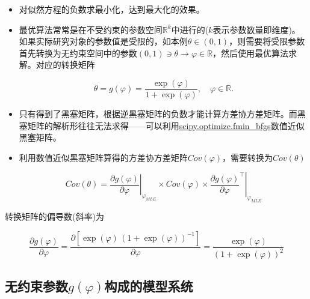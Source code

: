 \begin{itemize}
\tightlist
\item
  对似然方程的负数求最小化，达到最大化的效果。
\item
  最优算法常常是在不受约束的参数空间\(\mathbb{R}^{k}\)中进行的(\(k\)表示参数数量即维度)。如果实际研究对象的参数值是受限的，如本例\(\theta \in (0,1)\)，则需要将受限参数首先转换为无约束空间中的参数\((0,1) \ni \theta \rightarrow \varphi \in \mathbb{R}\)，然后使用最优算法求解。对应的转换矩阵

  \begin{equation}
  \theta = g(\varphi) = \frac{\exp(\varphi)}{ 1 + \exp(\varphi)}, \quad \varphi \in \mathbb{R}.
  \end{equation}
\item
  只有得到了黑塞矩阵，根据逆黑塞矩阵的负数才能计算方差协方差矩阵。而黑塞矩阵的解析形往往无法求得------可以利用\href{https://docs.scipy.org/doc/scipy/reference/generated/scipy.optimize.fmin_bfgs.html}{scipy.optimize.fmin\_bfgs}数值近似黑塞矩阵。
\item
  利用数值近似黑塞矩阵算得的方差协方差矩阵\(Cov(\varphi)\)，需要转换为\(Cov(\theta)\)

  \begin{equation}
  Cov(\theta) = \left. \frac{\partial g(\varphi)}{\partial \varphi} \right|_{\varphi_{MLE}} \times Cov(\varphi) \times \left. \frac{\partial g(\varphi)}{\partial \varphi}^{\top} \right|_{\varphi_{MLE}}
  \end{equation}
\end{itemize}

转换矩阵的偏导数(斜率)为

\begin{equation}
\frac{\partial g(\varphi)}{\partial \varphi} = \frac{
\partial \left[ \exp(\varphi) \, \left( 1 + \exp(\varphi) \right)^{-1} \right]
}{\partial \varphi} = \frac{\exp(\varphi)}{\left( 1 + \exp(\varphi) \right)^{2}}
\end{equation}

\subsection{\texorpdfstring{无约束参数\(g(\varphi)\)构成的模型系统}{无约束参数g(\textbackslash{}varphi)构成的模型系统}}\label{ux65e0ux7ea6ux675fux53c2ux6570gvarphiux6784ux6210ux7684ux6a21ux578bux7cfbux7edf}

